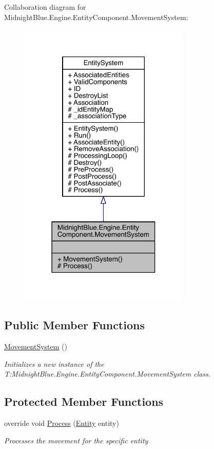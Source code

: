 Collaboration diagram for Midnight\+Blue.\+Engine.\+Entity\+Component.\+Movement\+System\+:
\nopagebreak
\begin{figure}[H]
\begin{center}
\leavevmode
\includegraphics[width=231pt]{class_midnight_blue_1_1_engine_1_1_entity_component_1_1_movement_system__coll__graph}
\end{center}
\end{figure}
\subsection*{Public Member Functions}
\begin{DoxyCompactItemize}
\item 
\hyperlink{class_midnight_blue_1_1_engine_1_1_entity_component_1_1_movement_system_a9f5770865523778efec6490954390c13}{Movement\+System} ()
\begin{DoxyCompactList}\small\item\em Initializes a new instance of the T\+:\+Midnight\+Blue.\+Engine.\+Entity\+Component.\+Movement\+System class. \end{DoxyCompactList}\end{DoxyCompactItemize}
\subsection*{Protected Member Functions}
\begin{DoxyCompactItemize}
\item 
override void \hyperlink{class_midnight_blue_1_1_engine_1_1_entity_component_1_1_movement_system_a7424e4fc15c75e0f663d31110fe6792a}{Process} (\hyperlink{class_midnight_blue_1_1_engine_1_1_entity_component_1_1_entity}{Entity} entity)
\begin{DoxyCompactList}\small\item\em Processes the movement for the specific entity \end{DoxyCompactList}\end{DoxyCompactItemize}
